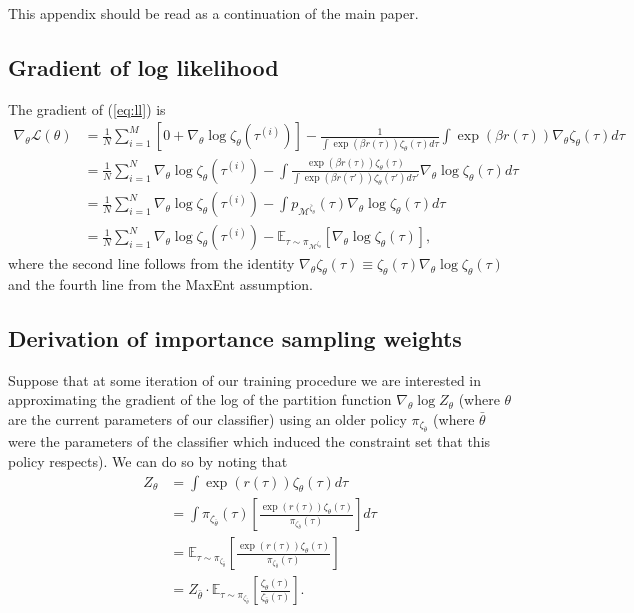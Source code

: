 This appendix should be read as a continuation of the main paper.
\subsection{Gradient of log likelihood}
\label{a:gll}
The gradient of (\ref{eq:ll}) is
\begin{equation}
    \begin{split}
        \nabla_\theta\mathcal{L}(\theta) &= \frac{1}{N}\sum_{i=1}^M\left[0 + \nabla_\theta \log \zeta_\theta(\tau^{(i)})\right] - \frac{1}{\int\exp(\beta r(\tau))\zeta_\theta(\tau)d\tau}\int\exp(\beta r(\tau))\nabla_\theta \zeta_\theta(\tau)d\tau\\
        &= \frac{1}{N}\sum_{i=1}^N\nabla_\theta \log \zeta_\theta(\tau^{(i)}) - \int\frac{\exp(\beta r(\tau))\zeta_\theta(\tau)}{\int\exp(\beta r(\tau'))\zeta_\theta(\tau')d\tau'}\nabla_\theta \log \zeta_\theta(\tau)d\tau\\
        &= \frac{1}{N}\sum_{i=1}^N\nabla_\theta \log \zeta_\theta(\tau^{(i)}) - \int p_{\mathcal{M}^{\bar{\zeta}_\theta}}(\tau)\nabla_\theta \log \zeta_\theta(\tau)d\tau\\
        &= \frac{1}{N}\sum_{i=1}^N\nabla_\theta \log \zeta_\theta(\tau^{(i)}) - \mathbb{E}_{\tau \sim \pi_{\mathcal{M}^{\zeta_\theta}}}\left[\nabla_\theta \log \zeta_\theta(\tau)\right],
    \end{split}
\end{equation}
where the second line follows from the identity $\nabla_\theta \zeta_\theta(\tau) \equiv \zeta_\theta(\tau) \nabla_\theta \log \zeta_\theta(\tau)$ and the fourth line from the MaxEnt assumption.

\subsection{Derivation of importance sampling weights}
\label{a:is}
Suppose that at some iteration of our training procedure we are interested in approximating the gradient of the log of the partition function $\nabla_\theta \log Z_\theta$ (where $\theta$ are the current parameters of our classifier) using an older policy $\pi_{\zeta_{\bar{\theta}}}$ (where $\bar{\theta}$ were the parameters of the classifier which induced the constraint set that this policy respects). We can do so by noting that
\begin{equation}
\begin{split}
    Z_\theta
	&= \int\exp(r(\tau)) \zeta_\theta(\tau)d\tau\\
	&= \int \pi_{\zeta_{\bar{\theta}}}(\tau) \left[\frac{\exp(r(\tau)) \zeta_\theta(\tau)}{\pi_{\zeta_{\bar{\theta}}}(\tau)}\right]d\tau\\
	&= \mathbb{E}_{\tau \sim \pi_{\zeta_{\bar{\theta}}}} \left[\frac{\exp(r(\tau)) \zeta_\theta(\tau)}{\pi_{\zeta_{\bar{\theta}}}(\tau)}\right]\\
	&= Z_{\bar{\theta}}\cdot\mathbb{E}_{\tau \sim \pi_{\zeta_{\bar{\theta}}}} \left[\frac{\zeta_\theta(\tau)}{\zeta_{\bar{\theta}}(\tau)}\right].\\
\end{split}
\label{eq:z_theta}
\end{equation}

